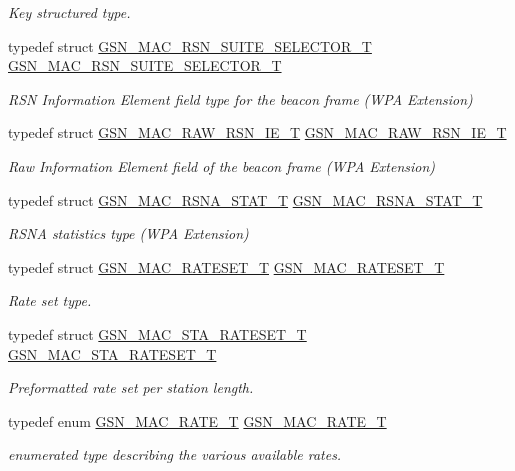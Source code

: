 \begin{DoxyCompactItemize}
\begin{DoxyCompactList}\small\item\em Key structured type. \end{DoxyCompactList}\item 
typedef struct \hyperlink{a00128}{GSN\_\-MAC\_\-RSN\_\-SUITE\_\-SELECTOR\_\-T} \hyperlink{a00642_ga26429f56abe84cea3365f048adb8870f}{GSN\_\-MAC\_\-RSN\_\-SUITE\_\-SELECTOR\_\-T}
\begin{DoxyCompactList}\small\item\em RSN Information Element field type for the beacon frame (WPA Extension) \end{DoxyCompactList}\item 
typedef struct \hyperlink{a00126}{GSN\_\-MAC\_\-RAW\_\-RSN\_\-IE\_\-T} \hyperlink{a00642_ga4a6cc0e7737d1ea40ea41dc94472455f}{GSN\_\-MAC\_\-RAW\_\-RSN\_\-IE\_\-T}
\begin{DoxyCompactList}\small\item\em Raw Information Element field of the beacon frame (WPA Extension) \end{DoxyCompactList}\item 
typedef struct \hyperlink{a00129}{GSN\_\-MAC\_\-RSNA\_\-STAT\_\-T} \hyperlink{a00642_ga72bcd48cbb7fbabbe7a09a5271e1723e}{GSN\_\-MAC\_\-RSNA\_\-STAT\_\-T}
\begin{DoxyCompactList}\small\item\em RSNA statistics type (WPA Extension) \end{DoxyCompactList}\item 
typedef struct \hyperlink{a00125}{GSN\_\-MAC\_\-RATESET\_\-T} \hyperlink{a00642_ga3030fec57a589cc8daf2616c8cad3e0d}{GSN\_\-MAC\_\-RATESET\_\-T}
\begin{DoxyCompactList}\small\item\em Rate set type. \end{DoxyCompactList}\item 
typedef struct \hyperlink{a00132}{GSN\_\-MAC\_\-STA\_\-RATESET\_\-T} \hyperlink{a00642_gaaffd1c48ebeedf03ed41954311a17ec0}{GSN\_\-MAC\_\-STA\_\-RATESET\_\-T}
\begin{DoxyCompactList}\small\item\em Preformatted rate set per station length. \end{DoxyCompactList}\item 
typedef enum \hyperlink{a00642_ga260da9755b2bec5e93c8b16a5a92d41d}{GSN\_\-MAC\_\-RATE\_\-T} \hyperlink{a00642_ga514160bf923e24c122096eecb9350b16}{GSN\_\-MAC\_\-RATE\_\-T}
\begin{DoxyCompactList}\small\item\em enumerated type describing the various available rates. \end{DoxyCompactList}\item 

\end{DoxyCompactItemize}
